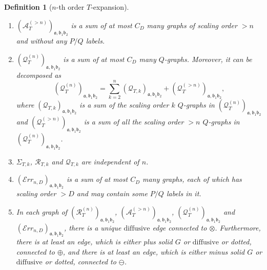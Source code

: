 \documentclass{article}
\newcommand{\1}{\mathds{1}}
\numberwithin{equation}{section}
\newcommand{\be}{\begin{equation}}
\newcommand{\ee}{\end{equation}}
\newcommand{\fa}{{\mathfrak a}}
\newcommand{\fb}{{\mathfrak b}}
\renewcommand{\cal}{\mathcal}
\newcommand{\dashed}{\text{diffusive}}
\theoremstyle{plain} %
\newtheorem{definition}[theorem]{Definition}
\theoremstyle{remark}
\newcommand{\Sdeltak}{{\Sigma}_{T,k}}
\newcommand{\PTn}{\mathcal R_T^{(n)}}
\newcommand{\PTk}{{\mathcal R_{T,k}}}
\newcommand{\QTn}{\mathcal Q_T^{(n)}}
\newcommand{\QTk}{{\mathcal Q_{T,k}}}
\newcommand{\ATn}{\mathcal A_T^{(>n)}}
\newcommand{\Err}{{\mathcal Err}}
\begin{document}
\begin{definition} [$n$-th order $T$-expansion]
\begin{enumerate}
\item  $(\ATn)_{\fa,\fb_1\fb_2}$ is a sum of at most $C_D$ many graphs of scaling order $> n$ and without any  $P/Q$ labels.  


\item $(\QTn)_{\fa,\fb_1\fb_2} $ is a sum of at most $C_D$ many $Q$-graphs.  Moreover, it can be decomposed as 
\be\label{decomposeQ} (\QTn)_{\fa,\fb_1\fb_2}= \sum_{k=2}^{n} (\QTk)_{\fa,\fb_1\fb_2} + (\cal Q^{(>n)}_T)_{\fa,\fb_1\fb_2},\ee
where  $(\QTk)_{\fa,\fb_1\fb_2}$ is a sum of the scaling order $k$ $Q$-graphs in $ (\QTn)_{\fa,\fb_1\fb_2}$ and $(\cal Q^{(>n)}_T)_{\fa,\fb_1\fb_2}$ is a sum of all the scaling order $>n$ $Q$-graphs in $ (\QTn)_{\fa,\fb_1\fb_2}$.



\item $\Sdeltak$, $\PTk$ and $\QTk$ are independent  of $n$.

\item $(\Err_{n,D})_{\fa,\fb_1\fb_2}$ is a sum of at most $C_D$ many graphs, each of which has scaling order $> D$ and may contain some $P/Q$ labels in it. 

\item In each graph of $(\PTn)_{\fa,\fb_1\fb_2}$, $(\ATn)_{\fa,\fb_1\fb_2}$, $(\QTn)_{\fa,\fb_1\fb_2} $ and $(\Err_{n,D})_{\fa,\fb_1\fb_2}$,  there is a unique  $\dashed$ edge connected to $\otimes$. Furthermore,  there is at least an edge, which is either  plus solid $G$ or $\dashed$ or dotted,  connected to  $\oplus$, 
 and  there is at least an edge, which is either  minus solid $G$ or $\dashed$ or dotted,  connected to $\ominus$.
 


\end{enumerate}
\end{definition}
\end{document}
